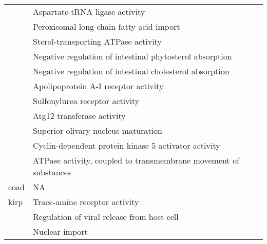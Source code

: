 \begin{appendices}
\begin{longtable}{lp{}}
                                 & Aspartate-tRNA ligase activity                                                                  \\
                                 & Peroxisomal long-chain fatty acid import                                                        \\
                                 & Sterol-transporting ATPase activity                                                             \\
                                 & Negative regulation of intestinal phytosterol absorption                                        \\
                                 & Negative regulation of intestinal cholesterol absorption                                        \\
                                 & Apolipoprotein A-I receptor activity                                                            \\
                                 & Sulfonylurea receptor activity                                                                  \\
                                 & Atg12 transferase activity                                                                      \\
                                 & Superior olivary nucleus maturation                                                             \\
                                 & Cyclin-dependent protein kinase 5 activator activity                                            \\
                                 & ATPase activity, coupled to transmembrane movement of substances                                \\
	\hline
	\gls{coad}                   & NA\tnote{1}                                                                                     \\
	\hline
	\gls{kirp}                   & Trace-amine receptor activity                                                                   \\
                                 & Regulation of viral release from host cell                                                      \\
                                 & Nuclear import                                                                                  \\

\end{longtable}
\end{appendices}
